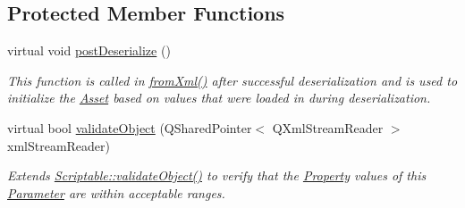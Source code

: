 \subsection*{Protected Member Functions}
\begin{DoxyCompactItemize}
\item 
virtual void \hyperlink{class_picto_1_1_color_parameter_aa58e21d2e99f41a146e63b61abecb4f8}{post\-Deserialize} ()
\begin{DoxyCompactList}\small\item\em This function is called in \hyperlink{class_picto_1_1_asset_a8bed4da09ecb1c07ce0dab313a9aba67}{from\-Xml()} after successful deserialization and is used to initialize the \hyperlink{class_picto_1_1_asset}{Asset} based on values that were loaded in during deserialization. \end{DoxyCompactList}\item 
virtual bool \hyperlink{class_picto_1_1_color_parameter_a2facb5a978973a54583ccb0951dacfd7}{validate\-Object} (Q\-Shared\-Pointer$<$ Q\-Xml\-Stream\-Reader $>$ xml\-Stream\-Reader)
\begin{DoxyCompactList}\small\item\em Extends \hyperlink{class_picto_1_1_scriptable_ab6e2944c43a3b5d418bf7b251594386d}{Scriptable\-::validate\-Object()} to verify that the \hyperlink{class_picto_1_1_property}{Property} values of this \hyperlink{class_picto_1_1_parameter}{Parameter} are within acceptable ranges. \end{DoxyCompactList}\end{DoxyCompactItemize}
